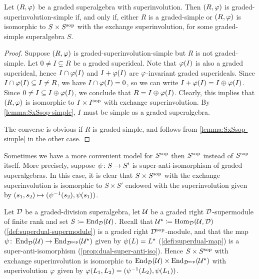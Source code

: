 \begin{prop}\label{prop:only-SxSsop-is-simple}
	Let $(R, \varphi)$ be a 
	graded superalgebra with superinvolution. 
	Then $(R, \varphi)$ is 
	graded-superinvolution-simple if, and only if, either $R$ is a graded-simple or $(R, \varphi)$ is isomorphic to $S\times S^{\mathrm{sop}}$ with the exchange superinvolution, for some graded-simple superalgebra $S$.
\end{prop}

\begin{proof}
	Suppose $(R, \varphi)$ is 
	graded-superinvolution-simple but $R$ is not graded-simple. 
	Let $0 \neq I \subsetneq R$ be a graded superideal.
	Note that $\varphi(I)$ is also a graded superideal, hence $I \cap \varphi(I)$ and $I + \varphi (I)$ are $\varphi$-invariant graded superideals. 
	Since $I \cap \varphi(I) \subseteq I \neq R$, we have $I \cap \varphi(I) = 0$, so we can write $I + \varphi (I) = I \oplus \varphi (I)$. 
	Since $0 \neq I \subseteq I \oplus \varphi (I)$, we conclude that $R = I \oplus \varphi (I)$.
	Clearly, this implies that $(R, \varphi)$ is isomorphic to $I \times I^{\mathrm{sop}}$ with exchange superinvolution. 
	By \cref{lemma:SxSsop-simple}, $I$ must be simple as a graded superalgebra. 
	
	The converse is obvious if $R$ is graded-simple, and follows from \cref{lemma:SxSsop-simple} in the other case.
\end{proof}
 
Sometimes we have a more convenient model for $S^{\mathrm{sop}}$ then $S^{\mathrm{sop}}$ instead of $S^{\mathrm{sop}}$ itself. 
More precisely, suppose $\psi\colon S \to S'$ is super-anti-isomorphism of graded superalgebras. 
In this case, it is clear that $S\times S^{\mathrm{sop}}$ with the exchange superinvolution is isomorphic to $S\times S'$ endowed with the superinvolution given by $(s_1, s_2) \mapsto (\psi^{-1} (s_2), \psi (s_1))$. 

\begin{defi}\label{defi:superdual-exchange}
    Let $\mathcal{D}$ be a graded-division superalgebra, let $\mathcal U$ be a graded right $\mathcal{D}$-supermodule of finite rank and set $S \coloneqq \operatorname{End}_{\mathcal{D}} (\mathcal U)$. 
    Recall that $\mathcal U^\star \coloneqq \operatorname{Hom}_{\mathcal{D}}(\mathcal U, \mathcal{D})$ (\cref{def:superdual-supermodule}) is a graded right $\mathcal{D}^{\mathrm{sop}}$-module, and that the map $\psi\colon \operatorname{End}_{\mathcal{D}} (\mathcal U) \to \operatorname{End}_{\mathcal{D}^{\mathrm{sop}}} (\mathcal U^\star)$ given by $\psi(L) = L^\star$ (\cref{defi:superdual-map}) is a super-anti-isomorphism (\cref{prop:dual-super-anti-iso}). 
    Hence $S\times S^{\mathrm{sop}}$ with exchange superinvolution is isomorphic to $\operatorname{End}_{\mathcal{D}} (\mathcal U) \times \operatorname{End}_{\mathcal{D}^{\mathrm{sop}}} (\mathcal U^\star)$ with superivolution $\varphi$ given by $\varphi(L_1, L_2) = (\psi^{-1}(L_2), \psi(L_1))$. 
\end{defi}


